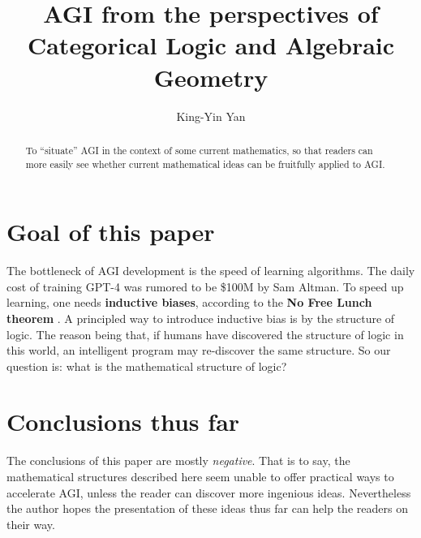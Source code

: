 \documentclass[runningheads]{llncs}
\begin{document}
%
\title{AGI from the perspectives of Categorical Logic and Algebraic Geometry}
%
%
\author{King-Yin Yan }
%
%
%
\maketitle              %
%
\begin{abstract}
To ``situate'' AGI in the context of some current mathematics, so that readers can more easily see whether current mathematical ideas can be fruitfully applied to AGI.

\end{abstract}
%
%
%
\section{Goal of this paper}

The bottleneck of AGI development is the speed of learning algorithms.  The daily cost of training GPT-4 was rumored to be \$100M by Sam Altman.  To speed up learning, one needs \textbf{inductive biases}, according to the \textbf{No Free Lunch theorem} \cite{Wolpert1997} \cite{Wikipedia-no-free-lunch}.  A principled way to introduce inductive bias is by the structure of logic.  The reason being that, if humans have discovered the structure of logic in this world, an intelligent program may re-discover the same structure.  So our question is:  what is the mathematical structure of logic?


\section{Conclusions thus far}

The conclusions of this paper are mostly \textit{negative}.  That is to say, the mathematical structures described here seem unable to offer practical ways to accelerate AGI, unless the reader can discover more ingenious ideas.  Nevertheless the author hopes the presentation of these ideas thus far can help the readers on their way.
\end{document}
